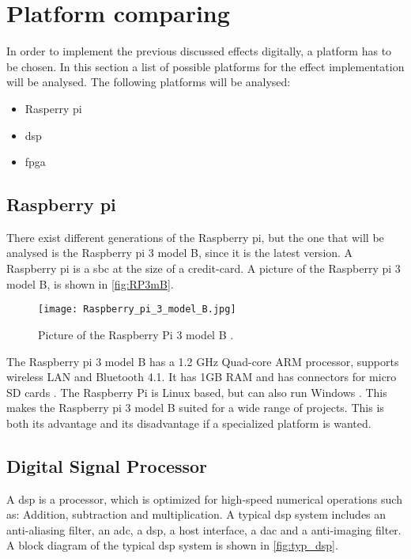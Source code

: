 \section{Platform comparing}
In order to implement the previous discussed effects digitally, a platform has to be chosen. In this section a list of possible platforms for the effect implementation will be analysed. The following platforms will be analysed:

\begin{itemize}
\item Rasperry pi
\item \gls{dsp}
\item \gls{fpga}
\end{itemize}

\subsection{Raspberry pi}
There exist different generations of the Raspberry pi, but the one that will be analysed is the Raspberry pi 3 model B, since it is the latest version. 
A Raspberry pi is a \gls{sbc} at the size of a credit-card. A picture of the Raspberry pi 3 model B, is shown in \autoref{fig:RP3mB}.

\begin{figure}[h]
	\centering
		\texttt{[image: Raspberry\_pi\_3\_model\_B.jpg]}
		\caption{Picture of the Raspberry Pi 3 model B \cite{Raspberry_pi}.}
		\label{fig:RP3mB}
\end{figure}

The Raspberry pi 3 model B has a 1.2 GHz Quad-core ARM processor, supports wireless LAN and Bluetooth 4.1. It has 1GB RAM and has connectors for micro SD cards \cite{Raspberry_pi}.
The Raspberry Pi is Linux based, but can also run Windows \cite{sparkfun_Raspberry_pi}. This makes the Raspberry pi 3 model B suited for a wide range of projects. This is both its advantage and its disadvantage if a specialized platform is wanted. 

\subsection{Digital Signal Processor}
A \gls{dsp} is a processor, which is optimized for high-speed numerical operations such as: Addition, subtraction and multiplication. A typical \gls{dsp} system includes an anti-aliasing filter, an \gls{adc}, a \gls{dsp}, a host interface, a \gls{dac} and a anti-imaging filter. A block diagram of the typical \gls{dsp} system is shown in \autoref{fig:typ_dsp}.

